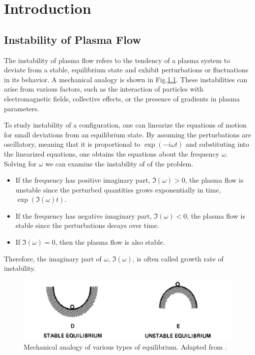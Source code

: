 \chapter{Introduction}
\section{Instability of Plasma Flow}
The instability of plasma flow refers to the tendency of a plasma system to deviate from a stable, equilibrium state and exhibit perturbations or fluctuations in its behavior. A mechanical analogy is shown in Fig.\ref{fig:stability-visualization}. These instabilities can arise from various factors, such as the interaction of particles with electromagnetic fields, collective effects, or the presence of gradients in plasma parameters.

To study instability of a configuration, one can linearize the equations of motion for small deviations from an equilibrium state. \cite{chen_introduction_2016} By assuming the perturbations are oscillatory, meaning that it is proportional to $\exp(-i\omega t)$ and substituting into the linearized equations, one obtains the equations about the frequency $\omega$. Solving for $\omega$ we can examine the instability of of the problem.
\begin{itemize}
  \item If the frequency has positive imaginary part, $\Im(\omega)>0$, the plasma flow is unstable since the perturbed quantities grows exponentially in time, $\exp(\Im(\omega)t)$.
  \item If the frequency has negative imaginary part, $\Im(\omega)<0$, the plasma flow is stable since the perturbations decays over time.

  \item If $\Im(\omega) = 0$, then the plasma flow is also stable. 
\end{itemize}

Therefore, the imaginary part of $\omega$, $\Im(\omega)$, is often called growth rate of instability.

\begin{figure}[htbp]
	\centering
	\includegraphics[width=0.7\linewidth]{figures/stability-visualization}
	\caption{Mechanical analogy of various types of equilibrium. Adapted from \cite{chen_introduction_2016}. }
	\label{fig:stability-visualization}
\end{figure}

